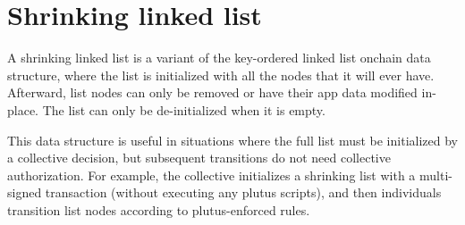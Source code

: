 \documentclass[../hydrozoa.tex]{subfiles}
\begin{document}
\section{Shrinking linked list}%
\label{h:shrinking-linked-list}


A shrinking linked list is a variant of the key-ordered linked list onchain data structure, where the list is initialized with all the nodes that it will ever have.
Afterward, list nodes can only be removed or have their app data modified in-place.
The list can only be de-initialized when it is empty.

This data structure is useful in situations where the full list must be initialized by a collective decision, but subsequent transitions do not need collective authorization.
For example, the collective initializes a shrinking list with a multi-signed transaction (without executing any plutus scripts), and then individuals transition list nodes according to plutus-enforced rules.


\end{document}
